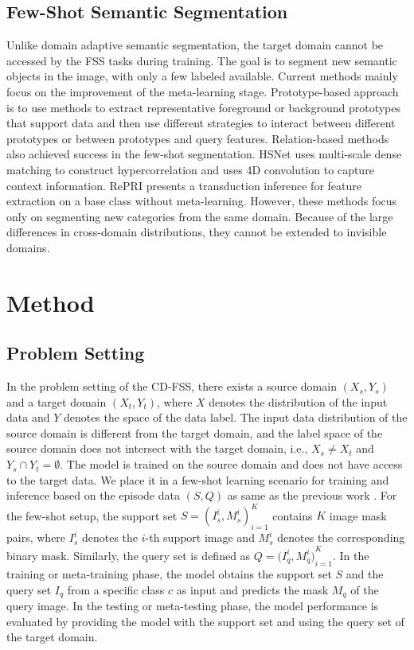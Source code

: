\documentclass{bmvc2k}
\begin{document}
\subsection{Few-Shot Semantic Segmentation}
Unlike domain adaptive semantic segmentation, the target domain cannot be accessed by the FSS tasks during training. The goal is to segment new semantic objects in the image, with only a few labeled available. 
Current methods mainly focus on the improvement of the meta-learning stage. 
Prototype-based approach \cite{zhang2019canet, wang2019panet, siam2019amp, okazawa2022interclass} is to use methods to extract representative foreground or background prototypes that support data and then use different strategies to interact between different prototypes or between prototypes and query features. 
Relation-based methods \cite{zhang2019pyramid, liu2020crnet, li2021few, tian2020prior, min2021hypercorrelation, Liu_2022_BMVC} also achieved success in the few-shot segmentation. 
HSNet \cite{min2021hypercorrelation} uses multi-scale dense matching to construct hypercorrelation and uses 4D convolution to capture context information.
RePRI \cite{boudiaf2021few} presents a transduction inference for feature extraction on a base class without meta-learning.
However, these methods focus only on segmenting new categories from the same domain. 
Because of the large differences in cross-domain distributions, they cannot be extended to invisible domains.


\section{Method}
\subsection{Problem Setting}
In the problem setting of the CD-FSS, there exists a source domain $(X_s, Y_s)$ and a target domain $(X_t, Y_t)$, where $X$ denotes the distribution of the input data and $Y$ denotes the space of the data label.
The input data distribution of the source domain is different from the target domain, and the label space of the source domain does not intersect with the target domain, i.e., $X_s \neq X_t$ and $Y_s \cap Y_t = \emptyset$.
The model is trained on the source domain and does not have access to the target data.
We place it in a few-shot learning scenario \cite{finn2017meta} for training and inference based on the episode data $(S, Q)$ as same as the previous work \cite{lei2022cross}.
For the few-shot setup, the support set $S = {(I^i_s, M^i_s)}^K_{i = 1}$ contains $K$ image mask pairs, where $I^i_s$ denotes the $i$-th support image and $M^i_s$ denotes the corresponding binary mask. 
Similarly, the query set is defined as $Q = ({I^i_q, M^i_q)}^K_{i = 1}$. 
In the training or meta-training phase, the model obtains the support set $S$ and the query set $I_q$ from a specific class $c$ as input and predicts the mask $M_q$ of the query image. 
In the testing or meta-testing phase, the model performance is evaluated by providing the model with the support set and using the query set of the target domain.
\end{document}
